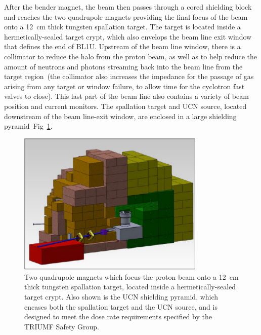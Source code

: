 After the bender magnet, the beam then passes through a cored
shielding block and reaches the two quadrupole magnets providing the
final focus of the beam onto a 12~cm thick tungsten spallation target.
The target is located inside a hermetically-sealed target crypt, which
also envelops the beam line exit window that defines the end of BL1U.
Upstream of the beam line window, there is a collimator to reduce the
halo from the proton beam, as well as to help reduce the amount of
neutrons and photons streaming back into the beam line from the target
region~(the collimator also increases the impedance for the passage of
gas arising from any target or window failure, to allow time for the
cyclotron fast valves to close). This last part of the beam line also
contains a variety of beam position and current monitors. The
spallation target and UCN source, located downstream of the beam
line-exit window, are enclosed in a large shielding
pyramid~Fig~\ref{fig:pyramid}.
\begin{figure}[h!]
  \centering
  \includegraphics[width=0.8\textwidth]{pyramid.png}
  \caption{Two quadrupole magnets which focus the proton beam onto a
    12~cm thick tungsten spallation target, located inside a
    hermetically-sealed target crypt. Also shown is the UCN shielding
    pyramid, which encases both the spallation target and the UCN
    source, and is designed to meet the dose rate requirements
    specified by the TRIUMF Safety Group.}
  \label{fig:pyramid}
\end{figure}

